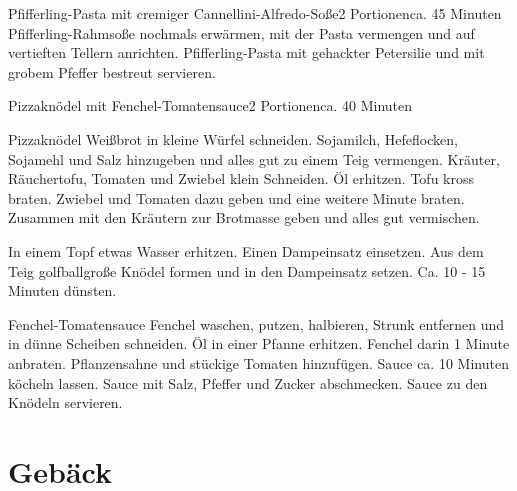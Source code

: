 \documentclass[a4paper,10pt]{article}
\begin{document}
\begin{recipe}{Pfifferling-Pasta mit cremiger Cannellini-Alfredo-Soße}{2 
Portionen}{ca. 45 Minuten}
	\newstep Pfifferling-Rahmsoße nochmals erwärmen, mit der Pasta 
	vermengen und auf vertieften Tellern anrichten. Pfifferling-Pasta mit 
	gehackter Petersilie und mit grobem Pfeffer bestreut servieren.
	
    \end{recipe}
    
    \newpage

    \begin{recipe}{Pizzaknödel mit Fenchel-Tomatensauce}{2 Portionen}{ca. 40 
Minuten}

        \freeform Pizzaknödel
        Weißbrot in kleine Würfel schneiden. Sojamilch, Hefeflocken, Sojamehl 
	und Salz hinzugeben und alles gut zu einem Teig vermengen.
	Kräuter, Räuchertofu, Tomaten und Zwiebel klein Schneiden.
	Öl erhitzen. Tofu kross braten. Zwiebel und Tomaten dazu geben und eine 
	weitere Minute braten. Zusammen mit den Kräutern zur Brotmasse geben 
	und alles gut vermischen.
	
	\newstep In einem Topf etwas Wasser erhitzen. Einen Dampeinsatz 
	einsetzen. Aus dem Teig golfballgroße Knödel formen und in den 
	Dampeinsatz setzen. Ca. 10 - 15 Minuten dünsten.

        \freeform Fenchel-Tomatensauce
        Fenchel waschen, putzen, halbieren, Strunk entfernen und in dünne 
	Scheiben schneiden.
        Öl in einer Pfanne erhitzen. Fenchel darin 1 Minute anbraten. 
	Pflanzensahne und stückige Tomaten hinzufügen. Sauce ca. 10 Minuten 
	köcheln lassen.
        Sauce mit Salz, Pfeffer und Zucker abschmecken. Sauce zu den Knödeln 
	servieren.
	
    \end{recipe}
    
    \newpage
    
    
    \section{Gebäck}
\end{document}
